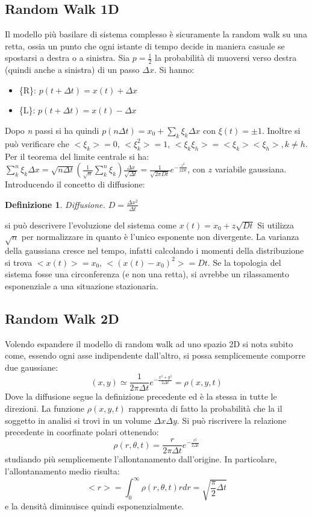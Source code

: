 \documentclass[12pt, a4paper]{article}
\theoremstyle{theorem}
\newtheorem{definition}{Definizione}[section]
\begin{document}
		\subsection{Random Walk 1D}
			Il modello più basilare di sistema complesso è sicuramente la random walk su una retta, ossia un punto che ogni istante di tempo decide in maniera casuale se spostarsi a destra o a sinistra.
			Sia $p=\frac{1}{2}$ la probabilità di muoversi verso destra (quindi anche a sinistra) di un passo $\Delta x$. Si hanno:
			\begin{itemize}
				\item \{R\}: $p(t+\Delta t)=x(t)+\Delta x$
				\item \{L\}: $p(t+\Delta t)=x(t)-\Delta x$
			\end{itemize}
			Dopo \textit{n} passi si ha quindi $p(n\Delta t)=x_0+\sum_k\xi_k\Delta x$ con $\xi(t)=\pm 1$.
			Inoltre si può verificare che $<\xi_k>=0$, $<\xi_k^2>=1$, $<\xi_k\xi_h>=<\xi_k><\xi_h>, k\neq h$.
			Per il teorema del limite centrale si ha:
			$\sum_k^n\xi_k\Delta x=\sqrt{n\Delta t}\left(\frac{1}{\sqrt{n}}\sum_k^n\xi_k\right)\frac{\Delta x}{\sqrt{\Delta t}}=\frac{1}{\sqrt{2\pi Dt}}e^{-\frac{z^2}{2Dt}}$, con $z$ variabile gaussiana.
			Introducendo il concetto di diffusione:\\
			\begin{definition}
				Diffusione. $D=\frac{\Delta x^2}{\Delta t}$
			\end{definition}
			si può descrivere l'evoluzione del sistema come $x(t)=x_0+z\sqrt{Dt}$
			Si utilizza $\sqrt{n}$ per normalizzare in quanto è l'unico esponente non divergente.
			La varianza della gaussiana cresce nel tempo, infatti calcolando i momenti della distribuzione si trova $<x(t)>=x_0$, $<(x(t)-x_0)^2>=Dt$.
			Se la topologia del sistema fosse una circonferenza (e non una retta), si avrebbe un rilassamento esponenziale a una situazione stazionaria.
		\subsection{Random Walk 2D}
			Volendo espandere il modello di random walk ad uno spazio 2D si nota subito come, essendo ogni asse indipendente dall'altro, si possa semplicemente comporre due gaussiane:\\
			\begin{equation}
				(x,y)\simeq\frac{1}{2\pi\Delta t}e^{-\frac{x^2+y^2}{2\Delta t}}=\rho(x,y,t)
			\end{equation}
			Dove la diffusione segue la definizione precedente ed è la stessa in tutte le direzioni.
			La funzione $\rho(x,y,t)$ rappresnta di fatto la probabilità che la il soggetto in analisi si trovi in un volume $\Delta x\Delta y$.
			Si può riscrivere la relazione precedente in coorfinate polari ottenendo:
			\begin{equation}
				\rho(r,\theta,t)=\frac{r}{2\pi\Delta t}e^{-\frac{r^2}{2\Delta t}}
			\end{equation}
			studiando più semplicemente l'allontanamento dall'origine.
			In particolare, l'allontanamento medio risulta:
			\begin{equation}
				<r>=\int_0^\infty\rho(r,\theta,t)rdr=\sqrt{\frac{\pi}{2}\Delta t}
			\end{equation}
			e la densità diminuisce quindi esponenzialmente.
\end{document}
